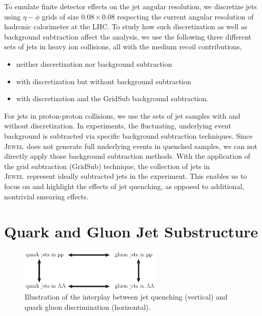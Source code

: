 \documentclass[notoc,preprintnumbers]{JHEP3}
\newcommand{\jw}{\textsc{Jewel}~}
\begin{document}
To emulate finite detector effects on the jet angular resolution, we discretize jets using $\eta-\phi$ grids of size $0.08 \times 0.08$ respecting the current angular resolution of hadronic calorimeter at the LHC. To study how such discretization as well as background subtraction affect the analysis, we use the following three different sets of jets in heavy ion collisions, all with the medium recoil contributions,
\begin{itemize}
	\item neither discretization nor background subtraction
	\item with discretization but without background subtraction
	\item with discretization and the GridSub \cite{KunnawalkamElayavalli:2017hxo} background subtraction.
\end{itemize}
For jets in proton-proton collisions, we use the sets of jet samples with and without discretization. In experiments, the fluctuating, underlying event background is subtracted via specific background subtraction techniques. Since \jw does not generate full underlying events in quenched samples, we can not directly apply those background subtraction methods. With the application of the grid subtraction (GridSub) technique, the collection of jets in \jw represent ideally subtracted jets in the experiment. This enables us to focus on and highlight the effects of jet quenching, as opposed to additional, nontrivial smearing effects.

\section{Quark and Gluon Jet Substructure}
\label{sec:qg}
\begin{figure}[t]
	   \centering
	   \includegraphics[width=0.6\textwidth]{plots/qg_HI}
	   \caption{Illustration of the interplay between jet quenching (vertical) and quark gluon discrimination (horizontal). }
	   \label{fig:quenching_discrimination}
\end{figure}
\end{document}
